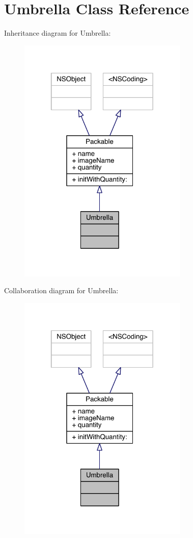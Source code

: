 \hypertarget{interface_umbrella}{\section{Umbrella Class Reference}
\label{interface_umbrella}
}


Inheritance diagram for Umbrella\-:\nopagebreak
\begin{figure}[H]
\begin{center}
\leavevmode
\includegraphics[width=229pt]{interface_umbrella__inherit__graph}
\end{center}
\end{figure}


Collaboration diagram for Umbrella\-:\nopagebreak
\begin{figure}[H]
\begin{center}
\leavevmode
\includegraphics[width=229pt]{interface_umbrella__coll__graph}
\end{center}
\end{figure}
